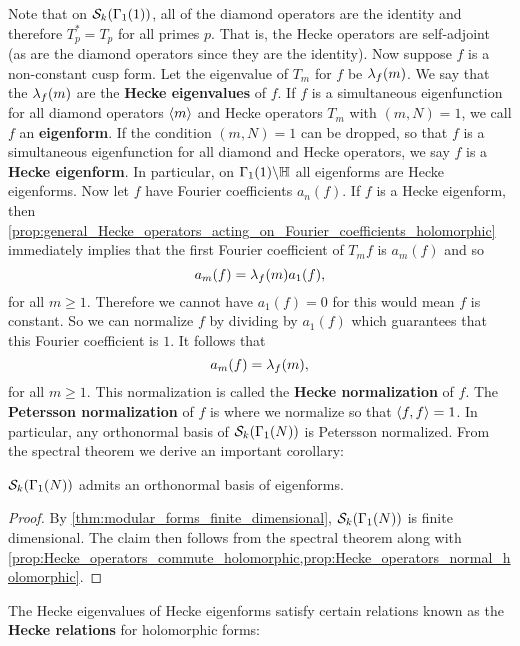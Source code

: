     Note that on $\mathcal{S}_{k}(\Gamma_{1}(1))$, all of the diamond operators are the identity and therefore $T_{p}^{\ast} = T_{p}$ for all primes $p$. That is, the Hecke operators are self-adjoint (as are the diamond operators since they are the identity). Now suppose $f$ is a non-constant cusp form. Let the eigenvalue of $T_{m}$ for $f$ be $\lambda_{f}(m)$. We say that the $\lambda_{f}(m)$ are the \textbf{Hecke eigenvalues} of $f$. If $f$ is a simultaneous eigenfunction for all diamond operators $\langle m\rangle$ and Hecke operators $T_{m}$ with $(m,N) = 1$, we call $f$ an \textbf{eigenform}. If the condition $(m,N) = 1$ can be dropped, so that $f$ is a simultaneous eigenfunction for all diamond and Hecke operators, we say $f$ is a \textbf{Hecke eigenform}. In particular, on $\Gamma_{1}(1)\backslash\mathbb{H}$ all eigenforms are Hecke eigenforms. Now let $f$ have Fourier coefficients $a_{n}(f)$. If $f$ is a Hecke eigenform, then \cref{prop:general_Hecke_operators_acting_on_Fourier_coefficients_holomorphic} immediately implies that the first Fourier coefficient of $T_{m}f$ is $a_{m}(f)$ and so
    \[
      a_{m}(f) = \lambda_{f}(m)a_{1}(f),
    \]
    for all $m \ge 1$. Therefore we cannot have $a_{1}(f) = 0$ for this would mean $f$ is constant. So we can normalize $f$ by dividing by $a_{1}(f)$ which guarantees that this Fourier coefficient is $1$. It follows that
    \[
      a_{m}(f) = \lambda_{f}(m),
    \]
    for all $m \ge 1$. This normalization is called the \textbf{Hecke normalization} of $f$. The \textbf{Petersson normalization} of $f$ is where we normalize so that $\langle f,f\rangle = 1$. In particular, any orthonormal basis of $\mathcal{S}_{k}(\Gamma_{1}(N))$ is Petersson normalized. From the spectral theorem we derive an important corollary:

    \begin{theorem}\label{thm:eigenforms_forms_spectral_theory_holomorphic}
      $\mathcal{S}_{k}(\Gamma_{1}(N))$ admits an orthonormal basis of eigenforms.
    \end{theorem}
    \begin{proof}
      By \cref{thm:modular_forms_finite_dimensional}, $\mathcal{S}_{k}(\Gamma_{1}(N))$ is finite dimensional. The claim then follows from the spectral theorem along with \cref{prop:Hecke_operators_commute_holomorphic,prop:Hecke_operators_normal_holomorphic}.
    \end{proof}

    The Hecke eigenvalues of Hecke eigenforms satisfy certain relations known as the \textbf{Hecke relations} for holomorphic forms:

